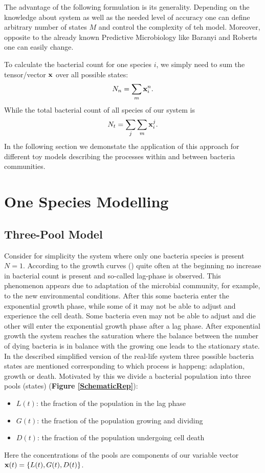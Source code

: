 \documentclass[10pt,A4paper]{article}
\begin{document}
The advantage of the following formulation is its generality. 
Depending on the knowledge about system as well as the needed level of accuracy one can define arbitrary number of states $M$ and control the complexity of teh model.
Moreover, opposite to the already known Predictive Microbiology like Baranyi and Roberts one can easily change.

To calculate the bacterial count for one species $i$, we simply need to sum the tensor/vector $\mathbf{x}$ over all possible states:
\begin{equation}
    N_n = \sum_m \mathbf{x}_i^n.
\end{equation}
While the total bacterial count of all species of our system is
\begin{equation}
    N_t = \sum_j \sum_m \mathbf{x}_i^j.
\end{equation}
In the following section we demonstate the application of this approach for different toy models describing the processes within and between bacteria communities.

\newpage

\section{One Species Modelling}
\subsection{Three-Pool Model}

Consider for simplicity the system where only one bacteria species is present $N=1$.
According to the growth curves () \cite{buchananLifePhasesBacterial1918, rolfeLagPhaseDistinct2012} quite often at the beginning no increase in bacterial count is present and so-called lag-phase is observed.
This phenomenon appears due to adaptation of the microbial community, for example, to the new environmental conditions.
After this some bacteria enter the exponential growth phase, while some of it may not be able to adjust and experience the cell death.
Some bacteria even may not be able to adjust and die other will enter the exponential growth phase after a lag phase. 
After exponential growth the system reaches the saturation where the balance between the number of dying bacteria is in balance with the growing one leads to the stationary state.
In the described simplified version of the real-life system three possible bacteria states are mentioned corresponding to which process is happeng: adaplation, growth or death.
Motivated by this we divide a bacterial population into three pools (states) (\textbf{Figure \ref{SchematicRep}}): 
\begin{itemize}
\item $L(t)$: the fraction of the population in the lag phase
\item $G(t)$: the fraction of the population growing and dividing
\item $D(t)$: the fraction of the population undergoing cell death
\end{itemize}
Here the concentrations of the pools are components of our variable vector $\mathbf{x} (t) =\{L(t), G(t), D(t)\}$.
\end{document}
